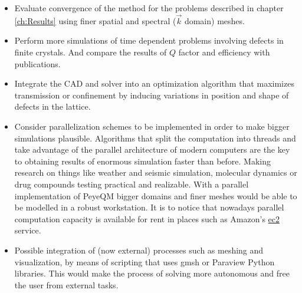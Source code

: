 \begin{itemize}
%
\item Evaluate convergence of the method for the problems described in chapter \ref{ch:Results} using finer spatial and spectral ($\vec{k}$ domain) meshes.
%
\item Perform more simulations of time dependent problems involving defects in finite crystals. And compare the results of $Q$ factor and efficiency with  publications.
%
\item Integrate the CAD and solver into an optimization algorithm that maximizes transmission or confinement by inducing variations in position and shape of defects in the lattice.
%
\item Consider parallelization schemes to be implemented in order to make bigger simulations plausible. Algorithms that split the computation into threads and take advantage of the parallel architecture of modern computers are the key to obtaining results of enormous simulation faster than before. Making research on things like weather and seismic simulation, molecular dynamics or drug compounds testing practical and realizable. With a parallel implementation of PeyeQM bigger domains and finer meshes would be able to be modelled in a robust workstation. It is to notice that nowadays parallel computation capacity is available for rent in places such as Amazon's \href{http://aws.amazon.com/ec2/}{ec2} service.
\item Possible integration of (now external) processes such as meshing and visualization, by means of scripting that uses gmsh or Paraview Python libraries. This would make the process of solving more autonomous and free the user from external tasks.
\end{itemize}



